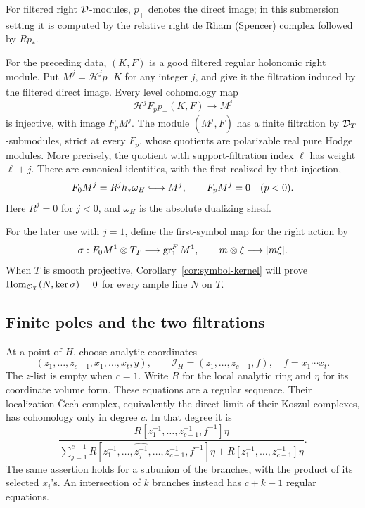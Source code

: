 For filtered right \(\mathcal D\)-modules, \(p_+\) denotes the direct image;
in this submersion setting it is computed by the relative right de Rham
(Spencer) complex followed by \(Rp_*\).

\begin{proposition}\label{prop:filtered-snc}
For the preceding data, \((K,F)\) is a good filtered regular holonomic
right module.  Put \(M^j=\mathcal H^j p_+K\) for any integer \(j\), and
give it the filtration induced by the filtered direct image.  Every
level cohomology map
\[
 \mathcal H^j F_p p_+(K,F)\longrightarrow M^j
\]
is injective, with image \(F_pM^j\).  The module \((M^j,F)\) has a finite
filtration by \(\mathcal D_T\)-submodules, strict at every \(F_p\), whose
quotients are polarizable real pure Hodge modules.  More precisely, the
quotient with support-filtration index \(\ell\) has weight \(\ell+j\).
There are canonical identities, with the first realized by that injection,
\begin{equation}\label{eq:lowest-direct-image}
 F_0M^j=R^jh_*\omega_H\lhook\joinrel\longrightarrow M^j,
 \qquad F_pM^j=0\quad(p<0).
\end{equation}
Here \(R^j=0\) for \(j<0\), and \(\omega_H\) is the absolute dualizing
sheaf.
\end{proposition}

For the later use with \(j=1\), define the first-symbol map for the right
action by
\[
 \sigma:F_0M^1\otimes T_T\longrightarrow\operatorname{gr}^F_1M^1,
 \qquad m\otimes\xi\longmapsto[m\xi].
\]
When \(T\) is smooth projective, Corollary~\ref{cor:symbol-kernel} will
prove \(\operatorname{Hom}_{\mathcal O_T}(N,\ker\sigma)=0\) for every ample line
\(N\) on \(T\).

\subsection{Finite poles and the two filtrations}

At a point of \(H\), choose analytic coordinates
\[
 (z_1,\ldots,z_{c-1},x_1,\ldots,x_t,y),\qquad
 \mathscr I_H=(z_1,\ldots,z_{c-1},f),\quad f=x_1\cdots x_t.
\]
The \(z\)-list is empty when \(c=1\).  Write \(R\) for the local analytic
ring and \(\eta\) for its coordinate volume form.  These equations are
a regular sequence.  Their localization \v Cech complex, equivalently
the direct limit of their Koszul complexes, has cohomology only in degree
\(c\).  In that degree it is
\begin{equation}\label{eq:polar-cech}
 \frac{R[z_1^{-1},\ldots,z_{c-1}^{-1},f^{-1}]\eta}
 {\displaystyle\sum_{j=1}^{c-1}
 R[z_1^{-1},\ldots,\widehat{z_j^{-1}},\ldots,z_{c-1}^{-1},f^{-1}]\eta
 +R[z_1^{-1},\ldots,z_{c-1}^{-1}]\eta}.
\end{equation}
The same assertion holds for a subunion of the branches, with the product
of its selected \(x_i\)'s.  An intersection of \(k\) branches instead
has \(c+k-1\) regular equations.

